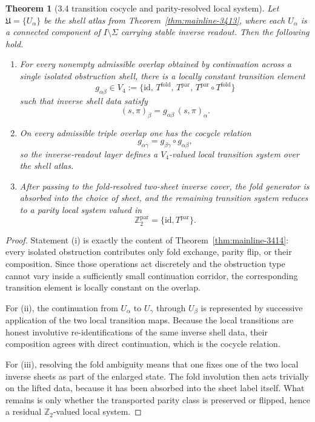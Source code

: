 \documentclass[12pt,a4paper]{article}
\newtheorem{theorem}{Theorem}[section]
\begin{document}
\begin{theorem}[3.4 transition cocycle and parity-resolved local system]
\label{thm:mainline-3415}
Let $\mathfrak U=\{U_\alpha\}$ be the shell atlas from Theorem~\ref{thm:mainline-3413}, where each $U_\alpha$ is a connected component of $I\setminus\Sigma$ carrying stable inverse readout. Then the following hold.
\begin{enumerate}[label=(\roman*)]
 \item For every nonempty admissible overlap obtained by continuation across a single isolated obstruction shell, there is a locally constant transition element
 \[
 g_{\alpha\beta}\in V_4:=\{\mathrm{id},\,T^{\mathrm{fold}},\,T^{\mathrm{par}},\,T^{\mathrm{par}}\circ T^{\mathrm{fold}}\}
 \]
 such that inverse shell data satisfy
 \[
 (s,\pi)_\beta = g_{\alpha\beta}\,(s,\pi)_\alpha.
 \]
 \item On every admissible triple overlap one has the cocycle relation
 \[
 g_{\alpha\gamma}=g_{\beta\gamma}\circ g_{\alpha\beta},
 \]
 so the inverse-readout layer defines a $V_4$-valued local transition system over the shell atlas.
 \item After passing to the fold-resolved two-sheet inverse cover, the fold generator is absorbed into the choice of sheet, and the remaining transition system reduces to a parity local system valued in
 \[
 \mathbb Z_2^{\mathrm{par}}=\{\mathrm{id},T^{\mathrm{par}}\}.
 \]
\end{enumerate}
\end{theorem}

\begin{proof}
Statement (i) is exactly the content of Theorem~\ref{thm:mainline-3414}: every isolated obstruction contributes only fold exchange, parity flip, or their composition. Since those operations act discretely and the obstruction type cannot vary inside a sufficiently small continuation corridor, the corresponding transition element is locally constant on the overlap.

For (ii), the continuation from $U_\alpha$ to $U_\gamma$ through $U_\beta$ is represented by successive application of the two local transition maps. Because the local transitions are honest involutive re-identifications of the same inverse shell data, their composition agrees with direct continuation, which is the cocycle relation.

For (iii), resolving the fold ambiguity means that one fixes one of the two local inverse sheets as part of the enlarged state. The fold involution then acts trivially on the lifted data, because it has been absorbed into the sheet label itself. What remains is only whether the transported parity class is preserved or flipped, hence a residual $\mathbb Z_2$-valued local system.
\end{proof}
\end{document}
